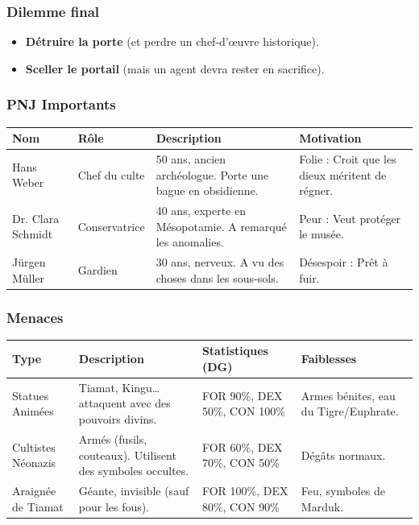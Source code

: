 \documentclass[10pt,a5paper,twoside]{book}
\begin{document}
\subsubsection*{Dilemme final}
\begin{itemize}
\item \textbf{Détruire la porte} (et perdre un chef-d'œuvre historique).
\item \textbf{Sceller le portail} (mais un agent devra rester en sacrifice).
\end{itemize}

\newpage

\subsubsection*{PNJ Importants}
\begin{center}
	\begin{tabular}{|P{2cm}|P{3cm}|P{3.5cm}|P{2.5cm}|}
	\hline
	\textbf{Nom} 		& \textbf{Rôle} 	& \textbf{Description} 											& \textbf{Motivation} \\ \hline
	Hans Weber 			& Chef du culte 	& 50 ans, ancien archéologue. Porte une bague en obsidienne. 	& Folie : Croit que les dieux méritent de régner. \\ \hline
	Dr. Clara Schmidt 	& Conservatrice 	& 40 ans, experte en Mésopotamie. A remarqué les anomalies. 	& Peur : Veut protéger le musée. \\ \hline
	Jürgen Müller		& Gardien 			& 30 ans, nerveux. A vu des choses dans les sous-sols. 			& Désespoir : Prêt à fuir. \\ \hline
	\end{tabular}
\end{center}

\subsubsection*{Menaces}
\begin{center}
	\begin{tabular}{|P{2cm}|P{3cm}|P{3.5cm}|P{2.5cm}|}
	\hline
	\textbf{Type} 		& \textbf{Description} 											& \textbf{Statistiques (DG)} 		& \textbf{Faiblesses} \\ \hline
	Statues Animées 	& Tiamat, Kingu\ldots~  attaquent avec des pouvoirs divins. 			& FOR 90\%, DEX 50\%, CON 100\% 	& Armes bénites, eau du Tigre/Euphrate. \\ \hline
	Cultistes Néonazis 	& Armés (fusils, couteaux). Utilisent des symboles occultes. 	& FOR 60\%, DEX 70\%, CON 50\% 		& Dégâts normaux. \\ \hline
	Araignée de Tiamat 	& Géante, invisible (sauf pour les fous). 						& FOR 100\%, DEX 80\%, CON 90\% 	& Feu, symboles de Marduk. \\ \hline
	\end{tabular}
\end{center}
\end{document}
